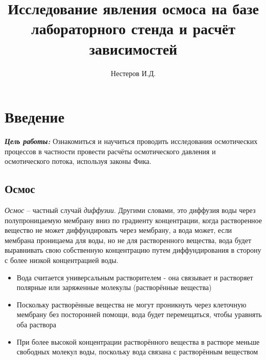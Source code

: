 \documentclass{article}
\title{Исследование явления осмоса на базе лабораторного стенда и расчёт зависимостей}
\author{Нестеров И.Д.}
\date{}
\begin{document}
    \maketitle
    \tableofcontents
    \newpage

    \section*{Введение}

        \hspace*{4mm}\textbf{\textit{Цель работы:}} Ознакомиться и научиться проводить исследования осмотических
        процессов в частности провести расчёты осмотического давления и осмотического потока, используя законы Фика.
        
        \subsection*{Осмос}
            \hspace*{4mm}\textit{Осмос} – частный случай \textit{диффузии}. Другими словами, это диффузия воды
            через полупроницаемую мембрану вниз по градиенту концентрации, когда
            растворенное вещество не может диффундировать через мембрану, а вода может,
            если мембрана проницаема для воды, но не для растворенного
            вещества, вода будет выравнивать свою собственную концентрацию путем
            диффундирования в сторону с более низкой концентрацией воды.

            \begin{itemize}
                \item Вода считается универсальным растворителем -
                она связывает и растворяет полярные или заряженные
                молекулы (растворённые вещества)

                \item Поскольку растворённые вещества не могут
                проникнуть через клеточную мембрану без посторонней
                помощи, вода будет перемещаться, чтобы уравнять оба
                раствора

                \item При более высокой концентрации растворённого
                вещества в растворе меньше свободных молекул воды,
                поскольку вода связана с растворённым веществом
            \end{itemize}
\end{document}
